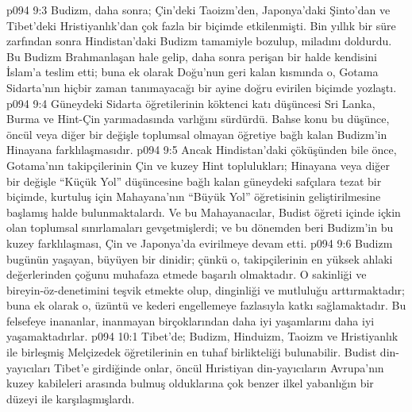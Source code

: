 \vs p094 9:3 Budizm, daha sonra; Çin’deki Taoizm’den, Japonya’daki Şinto’dan ve Tibet’deki Hristiyanlık'dan çok fazla bir biçimde etkilenmişti. Bin yıllık bir süre zarfından sonra Hindistan’daki Budizm tamamiyle bozulup, miladını doldurdu. Bu Budizm Brahmanlaşan hale gelip, daha sonra perişan bir halde kendisini İslam’a teslim etti; buna ek olarak Doğu’nun geri kalan kısmında o, Gotama Sidarta’nın hiçbir zaman tanımayacağı bir ayine doğru evirilen biçimde yozlaştı.
\vs p094 9:4 Güneydeki Sidarta öğretilerinin köktenci katı düşüncesi Sri Lanka, Burma ve Hint\hyp{}Çin yarımadasında varlığını sürdürdü. Bahse konu bu düşünce, öncül veya diğer bir değişle toplumsal olmayan öğretiye bağlı kalan Budizm’in Hinayana farklılaşmasıdır.
\vs p094 9:5 Ancak Hindistan’daki çöküşünden bile önce, Gotama’nın takipçilerinin Çin ve kuzey Hint toplulukları; Hinayana veya diğer bir değişle “Küçük Yol” düşüncesine bağlı kalan güneydeki safçılara tezat bir biçimde, kurtuluş için Mahayana’nın “Büyük Yol” öğretisinin geliştirilmesine başlamış halde bulunmaktalardı. Ve bu Mahayanacılar, Budist öğreti içinde içkin olan toplumsal sınırlamaları gevşetmişlerdi; ve bu dönemden beri Budizm’in bu kuzey farklılaşması, Çin ve Japonya’da evirilmeye devam etti.
\vs p094 9:6 Budizm bugünün yaşayan, büyüyen bir dinidir; çünkü o, takipçilerinin en yüksek ahlaki değerlerinden çoğunu muhafaza etmede başarılı olmaktadır. O sakinliği ve bireyin\hyp{}öz\hyp{}denetimini teşvik etmekte olup, dinginliği ve mutluluğu arttırmaktadır; buna ek olarak o, üzüntü ve kederi engellemeye fazlasıyla katkı sağlamaktadır. Bu felsefeye inananlar, inanmayan birçoklarından daha iyi yaşamlarını daha iyi yaşamaktadırlar.
\vs p094 10:1 Tibet’de; Budizm, Hinduizm, Taoizm ve Hristiyanlık ile birleşmiş Melçizedek öğretilerinin en tuhaf birlikteliği bulunabilir. Budist din\hyp{}yayıcıları Tibet’e girdiğinde onlar, öncül Hıristiyan din\hyp{}yayıcıların Avrupa’nın kuzey kabileleri arasında bulmuş olduklarına çok benzer ilkel yabanlığın bir düzeyi ile karşılaşmışlardı.

